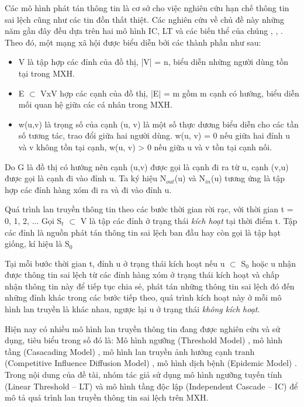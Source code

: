 Các mô hình phát tán thông tin là cơ sở cho việc nghiên cứu hạn chế thông tin sai lệch cũng như các tin đồn thất thiệt. Các nghiên cứu về chủ đề này những năm gần đây đều dựa trên hai mô hình IC, LT và các biến thể của chúng \cite{kemple2}, \cite{Golden}, \cite{Carnes}. Theo đó, một mạng xã hội được biểu diễn bởi các thành phần như sau:
\begin {itemize}
	\item V là tập hợp các đỉnh của đồ thị, |V| = n, biểu diễn những người dùng tồn tại trong MXH.

	\item E $\subset$ VxV hợp các cạnh của đồ thị, |E| = m gồm m cạnh có hướng, biểu diễn mối quan hệ giữa các cá nhân trong MXH.

	\item w(u,v) là trọng số của cạnh (u, v) là một số thực dương biểu diễn cho các tần số tương tác, trao đổi giữa hai người dùng. w(u, v) = 0 nếu giữa hai đỉnh u và v không tồn tại cạnh, w(u, v) > 0 nếu giữa u và v tồn tại cạnh nối.
\end {itemize}
Do G là đồ thị có hướng nên cạnh (u,v) được gọi là cạnh đi ra từ u, cạnh (v,u) được gọi là cạnh đi vào đỉnh u. Ta ký hiệu N$_{out}$(u) và N$_{in}$(u) tương ứng là tập hợp các đỉnh hàng xóm đi ra và đi vào đỉnh u.

Quá trình lan truyền thông tin theo các bước thời gian rời rạc, với thời gian t = 0, 1, 2, ... Gọi S$_{t}$ $\subset$ V là tập các đỉnh ở trạng thái {\itshape kích hoạt} tại thời điểm t. Tập các đỉnh là nguồn phát tán thông tin sai lệch ban đầu hay còn gọi là tập hạt giống, kí hiệu là S$_{0}$

Tại mỗi bước thời gian t, đỉnh u ở trạng thái kích hoạt nếu u $\subset$ S$_{0}$ hoặc u nhận được thông tin sai lệch từ các đỉnh hàng xóm ở trạng thái kích hoạt và chấp nhận thông tin này để tiếp tục chia sẻ, phát tán những thông tin sai lệch đó đến những đỉnh khác trong các bước tiếp theo, quá trình kích hoạt này ở mỗi mô hình lan truyền là khác nhau, ngược lại u ở trạng thái {\itshape không kích hoạt}.

Hiện nay có nhiều mô hình lan truyền thông tin đang được nghiên cứu và sử dụng, tiêu biểu trong số đó là: Mô hình ngưỡng (Threshold Model) \cite{kemple2}, mô hình tầng (Casacading Model) \cite{Golden}, mô hình lan truyền ảnh hưởng cạnh tranh (Competitive Influence Diffusion Model) \cite{Carnes}, mô hình dịch bệnh (Epidemic Model) \cite{leskovec}. Trong nội dung của đề tài, nhóm tác giả sử dụng mô hình ngưỡng tuyến tính (Linear Threshold – LT) và mô hình tầng độc lập (Independent Cascade – IC) \cite{kemple1} để mô tả quá trình lan truyền thông tin sai lệch trên MXH.

